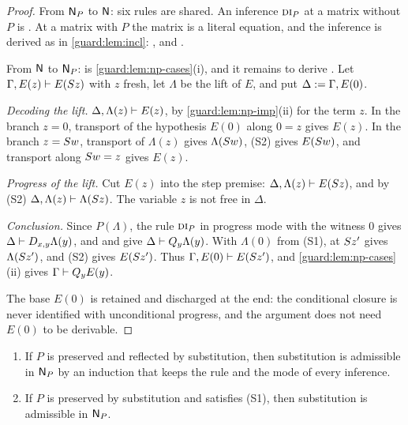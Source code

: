 \begin{proof}
From $\mathsf{N}_P$ to $\mathsf{N}$: six rules are shared.  An inference
$\rulename{DI}_P$ at a matrix without $P$ is .  At a matrix
with $P$ the matrix is a literal equation, and the inference is derived as
in \cref{guard:lem:incl}: ,  and .

From $\mathsf{N}$ to $\mathsf{N}_P$:  is \cref{guard:lem:np-cases}(i), and
it remains to derive .  Let $\Gamma,E(z)\vdash E(S z)$
with $z$ fresh, let $\Lambda$ be the lift of $E$, and put
$\Delta\mathrel{:=}\Gamma,E(0)$.

\emph{Decoding the lift.}  $\Delta,\Lambda(z)\vdash E(z)$, by
\cref{guard:lem:np-imp}(ii) for the term $z$.  In the branch $z=0$,
transport of the hypothesis $E(0)$ along $0=z$ gives $E(z)$.  In the branch
$z=S w$, transport of $\Lambda(z)$ gives $\Lambda(S w)$, (S2) gives
$E(S w)$, and transport along $S w=z$ gives $E(z)$.

\emph{Progress of the lift.}  Cut $E(z)$ into the step premise:
$\Delta,\Lambda(z)\vdash E(S z)$, and by (S2)
$\Delta,\Lambda(z)\vdash\Lambda(S z)$.  The variable $z$ is not free in
$\Delta$.

\emph{Conclusion.}  Since $P(\Lambda)$, the rule $\rulename{DI}_P$ in
progress mode with the witness $0$ gives $\Delta\vdash D_{x,y}\Lambda(y)$,
and  and  give $\Delta\vdash Q_{y}\Lambda(y)$.
With $\Lambda(0)$ from (S1),  at $S z'$ gives
$\Lambda(S z')$, and (S2) gives $E(S z')$.  Thus
$\Gamma,E(0)\vdash E(S z')$, and \cref{guard:lem:np-cases}(ii) gives
$\Gamma\vdash Q_{y}E(y)$.

The base $E(0)$ is retained and discharged at the end: the conditional
closure is never identified with unconditional progress, and the argument
does not need $E(0)$ to be derivable.
\end{proof}

\begin{proposition}
\label{guard:prop:np-subst}
\begin{enumerate}[label=\textup{(\roman*)}]
\item If $P$ is preserved and reflected by substitution, then substitution
 is admissible in $\mathsf{N}_P$ by an induction that keeps the rule and the mode
 of every inference.
\item If $P$ is preserved by substitution and satisfies \textup{(S1)}, then
 substitution is admissible in $\mathsf{N}_P$.
\end{enumerate}
\end{proposition}

